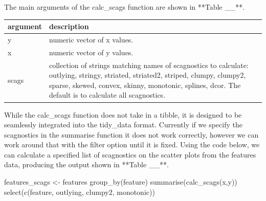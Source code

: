 The main arguments of the calc\_scags function are shown in **Table
\_\_**.

\begin{Schunk}

\begin{tabular}{l|l}
\hline
argument & description\\
\hline
y & numeric vector of x values.\\
\hline
x & numeric vector of y values.\\
\hline
scags & collection of strings matching names of scagnostics to calculate: outlying, stringy, striated, striated2, striped, clumpy, clumpy2, sparse, skewed, convex, skinny, monotonic, splines, dcor. The default is to calculate all scagnostics.\\
\hline
\end{tabular}

\end{Schunk}

While the calc\_scags function does not take in a tibble, it is designed
to be seamlessly integrated into the tidy\_data format. Currently if we
specify the scagnostics in the summarise function it does not work
correctly, however we can work around that with the filter option until
it is fixed. Using the code below, we can calculate a specified list of
scagnostics on the scatter plots from the features data, producing the
output shown in **Table \_\_**.

\begin{Schunk}
\begin{Sinput}
features_scags <- features %
  group_by(feature) %
  summarise(calc_scags(x,y)) %
  select(c(feature, outlying, clumpy2, monotonic))
\end{Sinput}
\end{Schunk}

